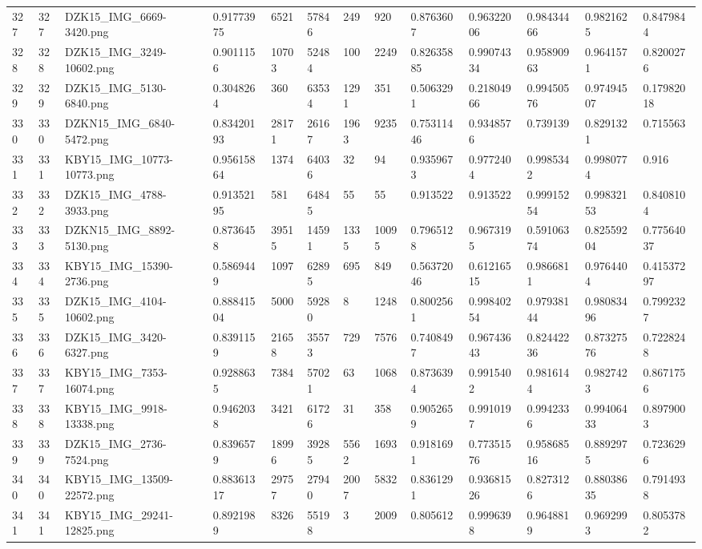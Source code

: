 \documentclass[11pt, a4paper, twoside]{report}
\begin{document}
\begin{longtable}[c]{@{}lllllllllllll@{}}
327 & 327 & DZK15\_IMG\_6669-3420.png & 0.91773975 & 6521 & 57846 & 249 & 920 & 0.8763607 & 0.96322006 & 0.98434466 & 0.9821625 & 0.8479844 \\
328 & 328 & DZK15\_IMG\_3249-10602.png & 0.9011156 & 10703 & 52484 & 100 & 2249 & 0.82635885 & 0.99074334 & 0.95890963 & 0.9641571 & 0.8200276 \\
329 & 329 & DZK15\_IMG\_5130-6840.png & 0.3048264 & 360 & 63534 & 1291 & 351 & 0.5063291 & 0.21804966 & 0.99450576 & 0.97494507 & 0.17982018 \\
330 & 330 & DZKN15\_IMG\_6840-5472.png & 0.83420193 & 28171 & 26167 & 1963 & 9235 & 0.75311446 & 0.9348576 & 0.739139 & 0.8291321 & 0.715563 \\
331 & 331 & KBY15\_IMG\_10773-10773.png & 0.95615864 & 1374 & 64036 & 32 & 94 & 0.9359673 & 0.9772404 & 0.9985342 & 0.9980774 & 0.916 \\
332 & 332 & DZK15\_IMG\_4788-3933.png & 0.91352195 & 581 & 64845 & 55 & 55 & 0.913522 & 0.913522 & 0.99915254 & 0.99832153 & 0.8408104 \\
333 & 333 & DZKN15\_IMG\_8892-5130.png & 0.8736458 & 39515 & 14591 & 1335 & 10095 & 0.7965128 & 0.9673195 & 0.59106374 & 0.82559204 & 0.77564037 \\
334 & 334 & KBY15\_IMG\_15390-2736.png & 0.5869449 & 1097 & 62895 & 695 & 849 & 0.56372046 & 0.61216515 & 0.9866811 & 0.9764404 & 0.41537297 \\
335 & 335 & DZK15\_IMG\_4104-10602.png & 0.88841504 & 5000 & 59280 & 8 & 1248 & 0.8002561 & 0.99840254 & 0.97938144 & 0.98083496 & 0.7992327 \\
336 & 336 & DZK15\_IMG\_3420-6327.png & 0.8391159 & 21658 & 35573 & 729 & 7576 & 0.7408497 & 0.96743643 & 0.82442236 & 0.87327576 & 0.7228248 \\
337 & 337 & KBY15\_IMG\_7353-16074.png & 0.9288635 & 7384 & 57021 & 63 & 1068 & 0.8736394 & 0.9915402 & 0.9816144 & 0.9827423 & 0.8671756 \\
338 & 338 & KBY15\_IMG\_9918-13338.png & 0.9462038 & 3421 & 61726 & 31 & 358 & 0.9052659 & 0.9910197 & 0.9942336 & 0.99406433 & 0.8979003 \\
339 & 339 & DZK15\_IMG\_2736-7524.png & 0.8396579 & 18996 & 39285 & 5562 & 1693 & 0.9181691 & 0.77351576 & 0.95868516 & 0.8892975 & 0.7236296 \\
340 & 340 & KBY15\_IMG\_13509-22572.png & 0.88361317 & 29757 & 27940 & 2007 & 5832 & 0.8361291 & 0.93681526 & 0.8273126 & 0.88038635 & 0.7914938 \\
341 & 341 & KBY15\_IMG\_29241-12825.png & 0.8921989 & 8326 & 55198 & 3 & 2009 & 0.805612 & 0.9996398 & 0.9648819 & 0.9692993 & 0.8053782 \\

\end{longtable}
\end{document}
